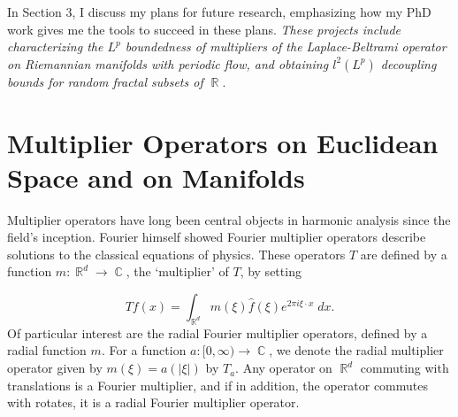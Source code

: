 \documentclass[11pt]{article}
\DeclareMathOperator{\RR}{\mathbb{R}}
\DeclareMathOperator{\CC}{\mathbb{C}}
\begin{document}

In Section 3, I discuss my plans for future research, emphasizing how my PhD work gives me the tools to succeed in these plans. \emph{These projects include characterizing the $L^p$ boundedness of multipliers of the Laplace-Beltrami operator on Riemannian manifolds with periodic flow, and obtaining $l^2(L^p)$ decoupling bounds for random fractal subsets of $\RR$}. %

\section{Multiplier Operators on Euclidean Space and on Manifolds} \label{Section1}



Multiplier operators have long been central objects in harmonic analysis since the field's inception. Fourier himself showed Fourier multiplier operators describe solutions to the classical equations of physics. These operators $T$ are defined by a function $m: \RR^d \to \CC$, the `multiplier' of $T$, by setting

%
\[ Tf(x) = \int_{\RR^d} m(\xi) \widehat{f}(\xi) e^{2 \pi i \xi \cdot x}\; dx. \]
%
Of particular interest are the radial Fourier multiplier operators, defined by a radial function $m$. For a function $a: [0,\infty) \to \CC$, we denote the radial multiplier operator given by $m(\xi) = a(|\xi|)$ by $T_a$. Any operator on $\RR^d$ commuting with translations is a Fourier multiplier, and if in addition, the operator commutes with rotates, it is a radial Fourier multiplier operator. %
\end{document}
